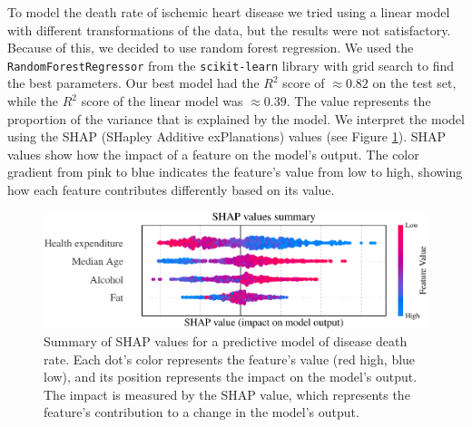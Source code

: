 

To model the death rate of ischemic heart disease we tried using a linear model with different transformations of the data, but the results were not satisfactory. 
Because of this, we decided to use random forest regression. 
We used the \texttt{RandomForestRegressor} from the \texttt{scikit-learn} library \citep{scikit-learn} with grid search to find the best parameters. Our best model had the 
$R^2$ score of $\approx0.82$ on the test set, while the $R^2$ score of the linear model was $\approx0.39$. The value represents the proportion of the variance that 
is explained by the model. We interpret the model using the SHAP (SHapley Additive exPlanations) values \citep{NIPS2017_7062} (see Figure \ref{shap_values}). SHAP values 
show how the impact of a feature on the model's output. The color gradient from pink to blue indicates the feature's value from low to high, 
showing how each feature contributes differently based on its value.


\begin{figure}[ht]
    \vskip 0.2in
    \begin{center}
    \centerline{\includegraphics[width=\columnwidth]{fig/shap_values_summary.pdf}}
    \caption{Summary of SHAP values for a predictive model of disease death rate. 
    Each dot's color represents the feature's value (red high, blue low), and its position represents the impact on the model's output.
    The impact is measured by the SHAP value, which represents the feature's contribution to a change in the model's output.}
    \label{shap_values}
    \end{center}
    \vskip -0.2in
\end{figure}


